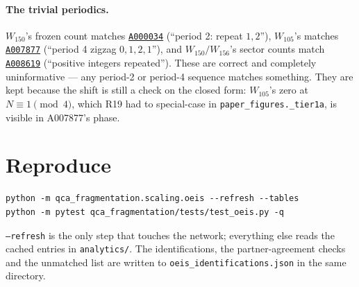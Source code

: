 \documentclass[11pt]{article}
\newcommand{\fn}[1]{\texttt{#1}}
\newcommand{\oeis}[1]{\href{https://oeis.org/#1}{\texttt{#1}}}
\theoremstyle{plain}
\begin{document}
\paragraph{The trivial periodics.} $W_{150}$'s frozen count matches
\oeis{A000034} (``period 2: repeat $1,2$''), $W_{105}$'s matches \oeis{A007877}
(``period 4 zigzag $0,1,2,1$''), and $W_{150}/W_{156}$'s sector counts match
\oeis{A008619} (``positive integers repeated''). These are correct and
completely uninformative --- any period-2 or period-4 sequence matches
something. They are kept because the shift is still a check on the closed form:
$W_{105}$'s zero at $N\equiv1\pmod 4$, which R19 had to special-case in
\fn{paper\_figures.\_tier1a}, is visible in A007877's phase.

\section{Reproduce}

\begin{verbatim}
python -m qca_fragmentation.scaling.oeis --refresh --tables
python -m pytest qca_fragmentation/tests/test_oeis.py -q
\end{verbatim}

\noindent \fn{--refresh} is the only step that touches the network; everything
else reads the cached entries in \fn{analytics/}. The identifications, the
partner-agreement checks and the unmatched list are written to
\fn{oeis\_identifications.json} in the same directory.
\end{document}
